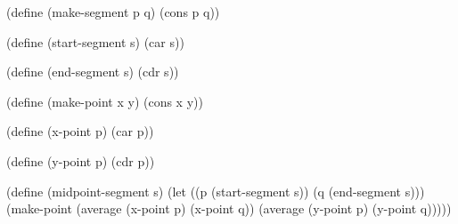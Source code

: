 \begtt\scm
(define (make-segment p q)
  (cons p q))

(define (start-segment s)
  (car s))

(define (end-segment s)
  (cdr s))

(define (make-point x y)
  (cons x y))

(define (x-point p)
  (car p))

(define (y-point p)
  (cdr p))

(define (midpoint-segment s)
  (let ((p (start-segment s))
        (q (end-segment s)))
    (make-point (average (x-point p)
                         (x-point q))
                (average (y-point p)
                         (y-point q)))))
\endtt
